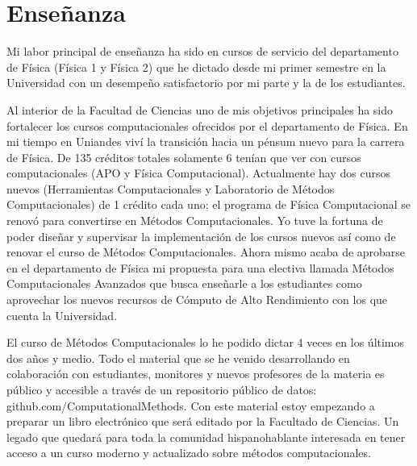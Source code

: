 \documentclass[letterpaper,12pt,onecolumn]{article}
\begin{document}
\section{{\Large{\sc Ense\~nanza}}}


Mi labor principal de ense\~nanza ha sido en cursos de servicio del
departamento de F\'isica (F\'isica 1 y F\'isica 2) que he dictado desde mi
primer semestre en la Universidad con un desempe\~no satisfactorio por
mi parte y la de los estudiantes.

Al interior de la Facultad de Ciencias uno de mis objetivos
principales ha sido fortalecer los cursos computacionales ofrecidos por
el departamento de F\'isica. En mi tiempo en Uniandes viv\'i la transici\'on
hacia un p\'ensum nuevo para la carrera de F\'isica. De 135 cr\'editos
totales solamente 6 ten\'ian que ver con cursos computacionales (APO y
F\'isica Computacional). Actualmente hay dos cursos nuevos (Herramientas
Computacionales y Laboratorio de M\'etodos Computacionales) de 1 cr\'edito
 cada uno; el programa de F\'isica Computacional se renov\'o para convertirse en
M\'etodos Computacionales. Yo tuve la fortuna de poder dise\~nar y
supervisar la implementaci\'on de los cursos nuevos as\'i como de renovar
el curso de M\'etodos  Computacionales. Ahora mismo acaba de aprobarse
en el departamento de F\'isica mi propuesta para una electiva llamada
M\'etodos Computacionales Avanzados que busca ense\~narle a los
estudiantes como aprovechar los nuevos  recursos de C\'omputo de Alto
Rendimiento con los que cuenta la Universidad.


El curso de M\'etodos Computacionales lo he podido dictar 4 veces en los
\'ultimos dos a\~nos y medio. Todo el material que se he venido
desarrollando en colaboraci\'on con estudiantes, monitores y nuevos
profesores de la materia es p\'ublico y accesible a trav\'es de un
repositorio p\'ublico de datos: github.com/ComputationalMethods.
Con este material estoy empezando a preparar un libro electr\'onico que
ser\'a editado por la Facultado de Ciencias. Un legado que quedar\'a para
toda la comunidad hispanohablante interesada en tener acceso a un
curso moderno y actualizado sobre m\'etodos computacionales.
\end{document}
